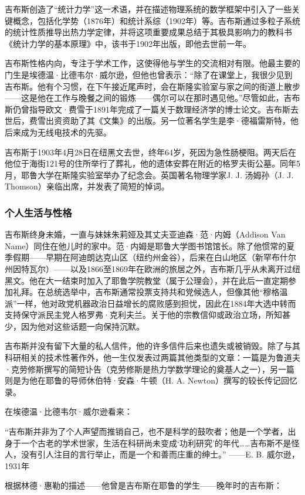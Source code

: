 吉布斯创造了“统计力学”这一术语，并在描述物理系统的数学框架中引入了一些关键概念，包括化学势（1876年）和统计系综（1902年）等。吉布斯通过多粒子系统的统计性质推导出热力学定律，并将这项重要成果总结于其极具影响力的教科书《统计力学的基本原理》中，该书于1902年出版，即他去世前一年。

吉布斯性格内向，专注于学术工作，这使得他与学生的交流相对有限。他最主要的门生是埃德温·比德韦尔·威尔逊，但他也曾表示：“除了在课堂上，我很少见到吉布斯。他有个习惯，在下午接近尾声时，会在斯隆实验室与家之间的街道上散步——这是他在工作与晚餐之间的锻炼——偶尔可以在那时遇见他。”尽管如此，吉布斯仍曾指导欧文·费雪于1891年完成了一篇关于数理经济学的博士论文。吉布斯去世后，费雪出资资助了其《文集》的出版。另一位著名学生是李·德福雷斯特，他后来成为无线电技术的先驱。

吉布斯于1903年4月28日在纽黑文去世，终年64岁，死因为急性肠梗阻。两天后在他位于海街121号的住所举行了葬礼，他的遗体安葬在附近的格罗夫街公墓。同年5月，耶鲁大学在斯隆实验室举办了纪念会。英国著名物理学家J. J. 汤姆孙（J. J. Thomson）亲临出席，并发表了简短的悼词。
\subsubsection{个人生活与性格}
吉布斯终身未婚，一直与妹妹朱莉娅及其丈夫亚迪森·范·内姆（Addison Van Name）同住在他儿时的家中。范·内姆是耶鲁大学图书馆馆长。除了他惯常的夏季假期——早期在阿迪朗达克山区（纽约州金谷），后来在白山地区（新罕布什尔州因特瓦尔）——以及1866至1869年在欧洲的旅居之外，吉布斯几乎从未离开过纽黑文。他在大一结束时加入了耶鲁学院教堂（属于公理会），并在此后一直定期参加礼拜。在总统选举中，吉布斯通常投票支持共和党候选人，但像其他“穆格温派”一样，他对政党机器政治日益增长的腐败感到担忧，因此在1884年大选中转而支持保守派民主党人格罗弗·克利夫兰。关于他的宗教信仰或政治立场，所知甚少，因为他对这些话题一向保持沉默。

吉布斯并没有留下大量的私人信件，他的许多信件后来也遗失或被销毁。除了与其科研相关的技术性著作外，他一生仅发表过两篇其他类型的文章：一篇是为鲁道夫·克劳修斯撰写的简短讣告（克劳修斯是热力学数学理论的奠基人之一），另一篇则是为他在耶鲁的导师休伯特·安森·牛顿（H. A. Newton）撰写的较长传记回忆录。

在埃德温·比德韦尔·威尔逊看来：

“吉布斯并非为了个人声望而推销自己，也不是科学的鼓吹者；他是一个学者，出身于一个古老的学术世家，生活在科研尚未变成‘功利研究’的年代……吉布斯不是怪人，没有引人注目的言行举止，而是一个和善而庄重的绅士。”
——E. B. 威尔逊，1931年

根据林德·惠勒的描述——他曾是吉布斯在耶鲁的学生——晚年时的吉布斯：

